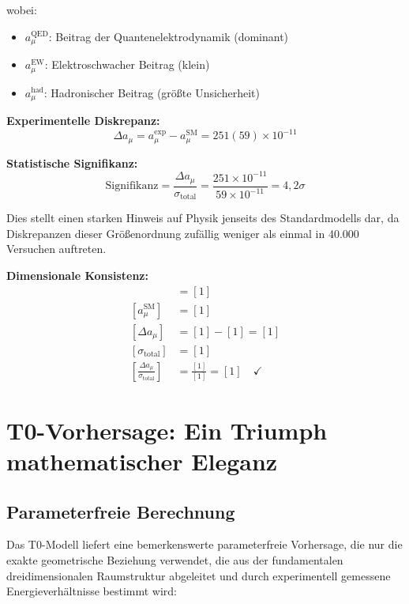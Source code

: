 \documentclass[12pt,a4paper]{report}
\begin{document}
	wobei:
	\begin{itemize}
		\item $a_\mu^{\text{QED}}$: Beitrag der Quantenelektrodynamik (dominant)
		\item $a_\mu^{\text{EW}}$: Elektroschwacher Beitrag (klein)
		\item $a_\mu^{\text{had}}$: Hadronischer Beitrag (größte Unsicherheit)
	\end{itemize}
	
	\textbf{Experimentelle Diskrepanz:}
	\begin{equation}
		\Delta a_\mu = a_\mu^{\text{exp}} - a_\mu^{\text{SM}} = 251(59) \times 10^{-11}
		\label{eq:muon_discrepancy}
	\end{equation}
	
	\textbf{Statistische Signifikanz:}
	\begin{equation}
		\text{Signifikanz} = \frac{\Delta a_\mu}{\sigma_{\text{total}}} = \frac{251 \times 10^{-11}}{59 \times 10^{-11}} = 4,2\sigma
	\end{equation}
	
	Dies stellt einen starken Hinweis auf Physik jenseits des Standardmodells dar, da Diskrepanzen dieser Größenordnung zufällig weniger als einmal in 40.000 Versuchen auftreten.
	
	\textbf{Dimensionale Konsistenz:}
	\begin{align}
		[a_\mu^{\text{exp}}] &= [1] \\
		[a_\mu^{\text{SM}}] &= [1] \\
		[\Delta a_\mu] &= [1] - [1] = [1] \\
		[\sigma_{\text{total}}] &= [1] \\
		\left[\frac{\Delta a_\mu}{\sigma_{\text{total}}}\right] &= \frac{[1]}{[1]} = [1] \quad \checkmark
	\end{align}
	
	\section{T0-Vorhersage: Ein Triumph mathematischer Eleganz}
	\label{sec:t0_prediction}
	
	\subsection{Parameterfreie Berechnung}
	\label{subsec:parameter_free}
	
	Das T0-Modell liefert eine bemerkenswerte parameterfreie Vorhersage, die nur die exakte geometrische Beziehung verwendet, die aus der fundamentalen dreidimensionalen Raumstruktur abgeleitet und durch experimentell gemessene Energieverhältnisse bestimmt wird:
	
\end{document}
